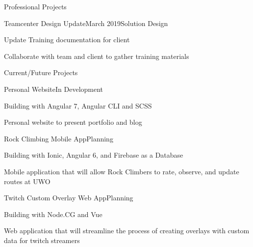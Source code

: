 \documentclass{resume} %
\begin{document}
\begin{rSection}{Professional Projects}
    \begin{rSubsection}{Teamcenter Design Update}{March 2019}{Solution Design}{}
        \item Update Training documentation for client
        \item Collaborate with team and client to gather training materials
    \end{rSubsection}
    
\end{rSection}

\begin{rSection}{Current/Future Projects}
    
    \begin{rSubsection}{Personal Website}{}{In Development}{}
        \item Building with Angular 7, Angular CLI and SCSS
        \item Personal website to present portfolio and blog
    \end{rSubsection}
    
    \begin{rSubsection}{Rock Climbing Mobile App}{}{Planning}{}
        \item Building with Ionic, Angular 6, and Firebase as a Database
        \item Mobile application that will allow Rock Climbers to rate, observe, and update routes at UWO
    \end{rSubsection}
    
    \begin{rSubsection}{Twitch Custom Overlay Web App}{}{Planning}{}
        \item Building with Node.CG and Vue
        \item Web application that will streamline the process of creating overlays with custom data for twitch streamers 
    \end{rSubsection}
    
\end{rSection}
\end{document}
